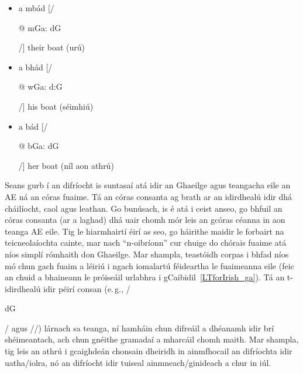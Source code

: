 \begin{multicols}{2}
\begin{itemize}
\item a mbád [/\begin{IPA}@ m\super Ga: d\super G\end{IPA}/] their boat (urú)
\item a bhád [/\begin{IPA}@ w\super Ga: d:G\end{IPA}/] his boat (séimhiú)
\item a bád [/\begin{IPA}@ b\super Ga: d\super G\end{IPA}/] her boat (níl aon athrú)
\end{itemize}

Seans gurb í an difríocht is suntasaí atá idir an Ghaeilge agus teangacha eile an AE ná an córas fuaime. Tá an córas consanta ag brath ar an idirdhealú idir dhá cháilíocht, caol agus leathan. Go bunúsach, is é atá i ceist anseo, go bhfuil an córas consanta (ar a laghad) dhá uair chomh mór leis an gcóras céanna in aon teanga AE eile.  Tig le hiarmhairtí éirí as seo, go háirithe maidir le forbairt na teicneolaíochta cainte, mar nach “n-oibríonn” cur chuige do chórais fuaime atá níos simplí rómhaith don Ghaeilge. Mar shampla, teastóidh corpas i bhfad níos mó chun gach fuaim a léiriú i ngach iomalartú féideartha le fuaimeanna eile (feic an chuid a bhaineann le próiseáil urlabhra i gCaibidil~\ref{LTforIrish_ga}). Tá an t-idirdhealú idir péirí consan (e.\,g., /\begin{IPA}d\super G\end{IPA}/ agus //) lárnach sa teanga, ní hamháin chun difreáil a dhéanamh idir brí shéimeantach, ach chun gnéithe gramadaí a mharcáil chomh maith. Mar shampla, tig leis an athrú i gcaighdeán chonsain dheiridh in ainmfhocail an difríochta idir uatha/iolra, nó an difríocht idir tuiseal ainmneach/ginideach a chur in iúl.


\end{multicols}
